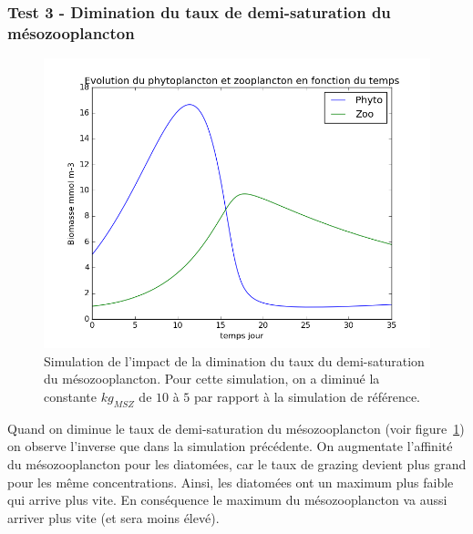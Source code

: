 {\subsubsection{Test 3 - Dimination du taux de demi-saturation du mésozooplancton}
\begin{figure}[h!]
  \includegraphics[width=\textwidth]{partie1/test3x35.png}
  \caption{Simulation de l'impact de la dimination du taux du demi-saturation du mésozooplancton. Pour
cette simulation, on a diminué la constante $kg_{MSZ}$ de $10$ à $5$ par rapport à la simulation de
référence.}
  \label{fig:partie1t3}
\end{figure}
\par{
Quand on diminue le taux de demi-saturation du mésozooplancton (voir figure~\ref{fig:partie1t3}) on observe
l'inverse que dans la simulation précédente. On augmentate l'affinité du mésozooplancton pour les diatomées,
car le taux de grazing devient plus grand pour les même concentrations. Ainsi, les diatomées ont un maximum plus
faible qui arrive plus vite. En conséquence le maximum du mésozooplancton va aussi arriver plus vite (et sera
moins élevé).
}
\FloatBarrier

\clearpage
}
